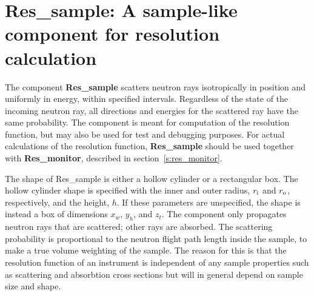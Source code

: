 \section{Res\_sample: A sample-like component for resolution calculation}
\label{s:res_sample}


The component \textbf{Res\_sample} scatters neutron rays isotropically
in position and uniformly in energy, within specified intervals. 
Regardless of the state of the incoming neutron ray, 
all directions and energies for the
scattered ray have the same probability. The component is meant
for computation of the resolution function, but may also be used
for test and debugging purposes. For actual calculations of the resolution
function, {\bf Res\_sample} should be used
together with \textbf{Res\_monitor}, described in
section~\ref{s:res_monitor}.

The shape of {\rm Res\_sample} is either a hollow cylinder
or a rectangular box. 
The hollow cylinder shape is
specified with the inner and outer radius, $r_{\rm i}$ and $r_{\rm o}$,
respectively, and the height, $h$.
If these parameters are unspecified,
the shape is instead a box of dimensions $x_w$, $y_h$, and $z_t$.
%
%
The component only propagates neutron rays that are scattered; 
other rays are absorbed. The scattering probability is proportional to the neutron
flight path length inside the sample, to make a true volume weighting
of the sample. The reason for this is that the resolution
function of an instrument is independent of any sample properties 
such as scattering and absorbtion cross sections but will in general
depend on sample size and shape.

